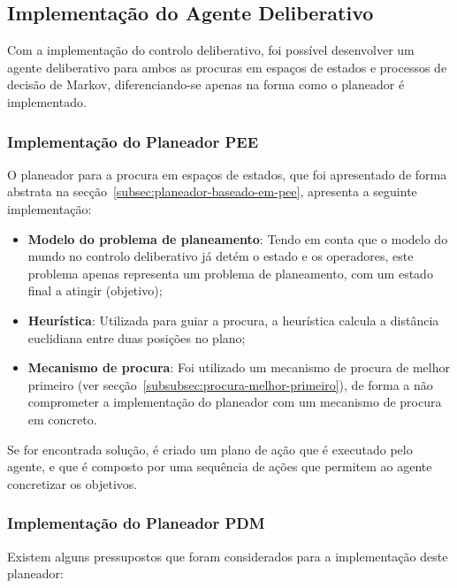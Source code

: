 \subsection{Implementação do Agente Deliberativo}\label{subsec:implementacao-agente-deliberativo}

Com a implementação do controlo deliberativo, foi possível desenvolver um agente deliberativo para ambos as procuras em espaços de estados e processos de decisão de Markov, diferenciando-se apenas na forma como o planeador é implementado.

\subsubsection{Implementação do Planeador PEE}\label{subsubsec:implementacao-planeador-pee}

O planeador para a procura em espaços de estados, que foi apresentado de forma abstrata na secção~\ref{subsec:planeador-baseado-em-pee},
apresenta a seguinte implementação:

\begin{itemize}
    \item \textbf{Modelo do problema de planeamento}: Tendo em conta que o modelo do mundo no controlo deliberativo já detém o estado e os operadores, este problema apenas representa um problema de planeamento, com um estado final a atingir (objetivo);
    \item \textbf{Heurística}: Utilizada para guiar a procura, a heurística calcula a distância euclidiana entre duas posições no plano;
    \item \textbf{Mecanismo de procura}: Foi utilizado um mecanismo de procura de melhor primeiro (ver secção~\ref{subsubsec:procura-melhor-primeiro}), de forma a não comprometer a implementação do planeador com um mecanismo de procura em concreto.
\end{itemize}

Se for encontrada solução, é criado um plano de ação que é executado pelo agente, e que é composto por uma sequência de ações que permitem ao agente concretizar os objetivos.

\subsubsection{Implementação do Planeador PDM}\label{subsubsec:implementacao-planeador-pdm}

Existem alguns pressupostos que foram considerados para a implementação deste planeador:


